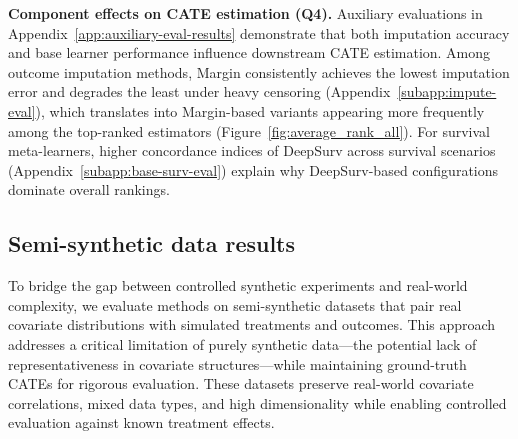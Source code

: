 \documentclass{article} %
\begin{document}


\textbf{Component effects on CATE estimation (Q4).} 
Auxiliary evaluations in Appendix~\ref{app:auxiliary-eval-results} demonstrate that both imputation accuracy and base learner performance influence downstream CATE estimation. Among outcome imputation methods, Margin consistently achieves the lowest imputation error and degrades the least under heavy censoring (Appendix~\ref{subapp:impute-eval}), which translates into Margin-based variants appearing more frequently among the top-ranked estimators (Figure~\ref{fig:average_rank_all}). For survival meta-learners, higher concordance indices of DeepSurv across survival scenarios (Appendix~\ref{subapp:base-surv-eval}) explain why DeepSurv-based configurations dominate overall rankings. 

\vspace{-0.5em}
\subsection{Semi-synthetic data results}
\label{sec:semi-syn-data-experiment}
\vspace{-0.5em}

To bridge the gap between controlled synthetic experiments and real-world complexity, we evaluate methods on semi-synthetic datasets that pair real covariate distributions with simulated treatments and outcomes. This approach addresses a critical limitation of purely synthetic data---the potential lack of representativeness in covariate structures---while maintaining ground-truth CATEs for rigorous evaluation. These datasets preserve real-world covariate correlations, mixed data types, and high dimensionality while enabling controlled evaluation against known treatment effects.
\end{document}
